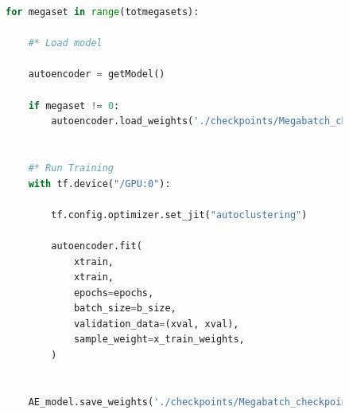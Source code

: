 \begin{figure}
    \centering
\begin{lstlisting}[language=Python, style=pythonstyle, label={code:megabatch_training}]
for megaset in range(totmegasets):
    
    #* Load model 

    autoencoder = getModel()
    
    if megaset != 0:
        autoencoder.load_weights('./checkpoints/Megabatch_checkpoint')
        
        
    #* Run Training
    with tf.device("/GPU:0"):

        tf.config.optimizer.set_jit("autoclustering")

        autoencoder.fit(
            xtrain,
            xtrain,
            epochs=epochs,
            batch_size=b_size,
            validation_data=(xval, xval),
            sample_weight=x_train_weights,
        )
        
    
    AE_model.save_weights('./checkpoints/Megabatch_checkpoint')

\end{lstlisting}
\end{figure}

